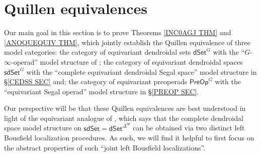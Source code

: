 \documentclass[a4paper,10pt
,draft
]{article}%
\begin{document}























\newpage



\section{Quillen equivalences}\label{QUIEQ SEC}

Our main goal in this section is to prove Theorems \ref{INC0AGJ THM} and \ref{ANOQUEQUIV THM},
which jointly establish the Quillen equivalence of three model categories:
the category of equivariant dendroidal sets $\mathsf{dSet}^G$
with the ``$G$-$\infty$-operad'' model structure of \cite[Thm 2.1]{Per17};
the category of equivariant dendroidal spaces
$\mathsf{sdSet}^G$ with the
``complete equivariant dendroidal Segal space'' model structure in \S \ref{CEDSS SEC} and;
the category of equivariant preoperads $\mathsf{PreOp}^G$
with the ``equivariant Segal operad'' model structure in \S \ref{PREOP SEC}.

Our perspective will be that these Quillen equivalences are best understood in light of the equivariant analogue of \cite[Thm. 6.6]{CM13a},
which says that the complete dendroidal space model structure
on $\mathsf{sdSet} = \mathsf{dSet}^{\Delta^{op}}$ can be obtained via two distinct left Bousfield localization procedures.
As such, we will find it helpful to first focus on the abstract properties of such ``joint left Bousfield localizations''.
\end{document}
